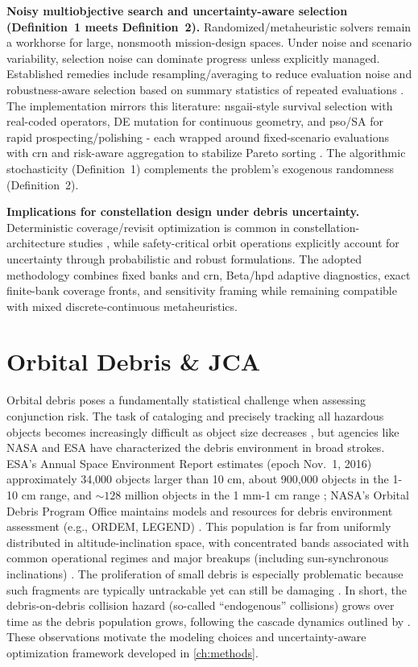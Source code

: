     \textbf{Noisy multiobjective search and uncertainty-aware selection (Definition~1 meets Definition~2).}
    Randomized/metaheuristic solvers remain a workhorse for large, nonsmooth mission-design spaces. Under noise and scenario variability, selection noise can dominate progress unless explicitly managed. Established remedies include resampling/averaging to reduce evaluation noise and robustness-aware selection based on summary statistics of repeated evaluations \cite{BeyerSendhoff2007,deb2006robustMO}. The implementation mirrors this literature: \gls{nsgaii}-style survival selection with real-coded operators, DE mutation for continuous geometry, and \gls{pso}/SA for rapid prospecting/polishing - each wrapped around fixed-scenario evaluations with \gls{crn} and risk-aware aggregation to stabilize Pareto sorting \cite{deb2002nsgaii,StornPrice1997,coello2002mopso,Spall2003}. The algorithmic stochasticity (Definition~1) complements the problem's exogenous randomness (Definition~2).
    
    \textbf{Implications for constellation design under debris uncertainty.}
    Deterministic coverage/revisit optimization is common in constellation-architecture studies \cite{ely1999GA,williams2001MOGA,ferringer2006jsr}, while safety-critical orbit operations explicitly account for uncertainty through probabilistic and robust formulations. The adopted methodology combines fixed banks and \gls{crn}, Beta/\gls{hpd} adaptive diagnostics, exact finite-bank coverage fronts, and sensitivity framing while remaining compatible with mixed discrete-continuous metaheuristics.

    \section{Orbital Debris \& JCA} \label{se:debrisjca}
    Orbital debris poses a fundamentally statistical challenge when assessing conjunction risk. The task of cataloging and precisely tracking all hazardous objects becomes increasingly difficult as object size decreases \citep{ESA,JARRY2019185,Phipps2011lodr}, but agencies like NASA and ESA have characterized the debris environment in broad strokes. ESA's Annual Space Environment Report estimates (epoch Nov.\ 1, 2016) approximately 34,000 objects larger than 10 cm, about 900,000 objects in the 1-10 cm range, and \(\sim\!128\) million objects in the 1 mm-1 cm range \citep{ESA}; NASA's Orbital Debris Program Office maintains models and resources for debris environment assessment (e.g., ORDEM, LEGEND) \citep{Krisko2014ORDEM}. This population is far from uniformly distributed in altitude-inclination space, with concentrated bands associated with common operational regimes and major breakups (including sun-synchronous inclinations) \citep{ESA}. The proliferation of small debris is especially problematic because such fragments are typically untrackable yet can still be damaging \citep{JARRY2019185,Phipps2011lodr}. In short, the debris-on-debris collision hazard (so-called ``endogenous'' collisions) grows over time as the debris population grows, following the cascade dynamics outlined by \citet{Kessler1978}. These observations motivate the modeling choices and uncertainty-aware optimization framework developed in \cref{ch:methods}.

